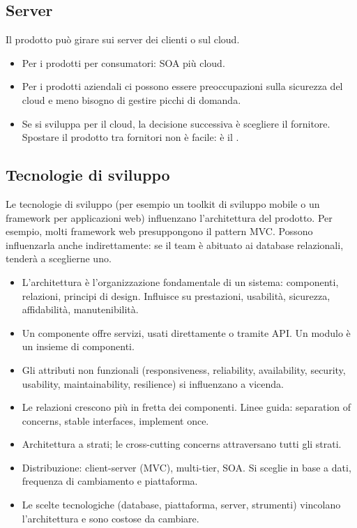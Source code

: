 \subsection{Server}

Il prodotto può girare sui server dei clienti o sul cloud.
\begin{itemize}
  \item Per i prodotti per consumatori: SOA più cloud.
  \item Per i prodotti aziendali ci possono essere preoccupazioni sulla sicurezza del cloud e meno bisogno di gestire
    picchi di domanda.
  \item Se si sviluppa per il cloud, la decisione successiva è scegliere il fornitore. Spostare il prodotto tra
    fornitori non è facile: è il .
\end{itemize}

\subsection{Tecnologie di sviluppo}

Le tecnologie di sviluppo (per esempio un toolkit di sviluppo mobile o un framework per applicazioni web)
influenzano l'architettura del prodotto. Per esempio, molti framework web presuppongono il pattern MVC. Possono
influenzarla anche indirettamente: se il team è abituato ai database relazionali, tenderà a sceglierne uno.

\begin{puntichiave}
\begin{itemize}
  \item L'architettura è l'organizzazione fondamentale di un sistema: componenti, relazioni, principi di design.
    Influisce su prestazioni, usabilità, sicurezza, affidabilità, manutenibilità.
  \item Un componente offre servizi, usati direttamente o tramite API. Un modulo è un insieme di componenti.
  \item Gli attributi non funzionali (responsiveness, reliability, availability, security, usability,
    maintainability, resilience) si influenzano a vicenda.
  \item Le relazioni crescono più in fretta dei componenti. Linee guida: separation of concerns, stable interfaces,
    implement once.
  \item Architettura a strati; le cross-cutting concerns attraversano tutti gli strati.
  \item Distribuzione: client-server (MVC), multi-tier, SOA. Si sceglie in base a dati, frequenza di cambiamento e
    piattaforma.
  \item Le scelte tecnologiche (database, piattaforma, server, strumenti) vincolano l'architettura e sono costose da
    cambiare.
\end{itemize}
\end{puntichiave}

